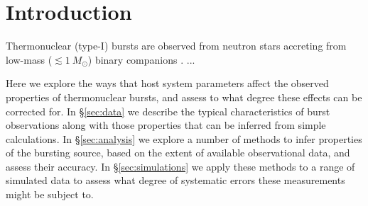 \documentclass{aastex63}
\begin{document}

\section{Introduction} \label{sec:intro}

Thermonuclear (type-I) bursts are observed from neutron stars accreting from low-mass ($\lesssim 1\ M_\odot$) binary companions \cite[e.g.][]{gal17b}. ...

Here we explore the ways that host system  parameters affect the observed properties of thermonuclear bursts, and assess to what degree these effects can be corrected for.
%
In \S\ref{sec:data} we describe the typical characteristics of burst observations along with those properties that can be 
inferred from simple calculations. %
% 
In \S\ref{sec:analysis} we explore a number of methods to infer properties of the bursting source, based on the extent of available observational data, and assess their accuracy.
%
In \S\ref{sec:simulations} we apply these methods to a range of simulated data to assess what degree of systematic errors these measurements might be subject to.
\end{document}
